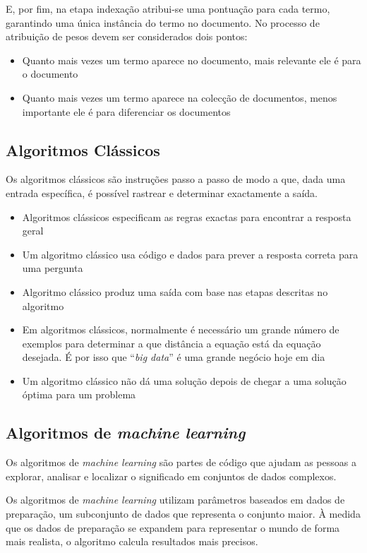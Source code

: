 E, por fim, na etapa indexação atribui-se uma pontuação para cada termo, garantindo uma única instância do termo no documento.
No processo de atribuição de pesos devem ser considerados dois pontos:
\begin{itemize}
  \item Quanto mais vezes um termo aparece no documento, mais relevante ele é para o documento
  \item Quanto mais vezes um termo aparece na colecção de documentos, menos importante ele é para diferenciar os documentos
\end{itemize}

\subsection{Algoritmos Clássicos}

Os algoritmos clássicos são instruções passo a passo de modo a que, dada uma entrada específica, é possível rastrear e determinar exactamente a saída.
\begin{itemize}
  \item Algoritmos clássicos especificam as regras exactas para encontrar a resposta geral
  \item Um algoritmo clássico usa código e dados para prever a resposta correta para uma pergunta
  \item Algoritmo clássico produz uma saída com base nas etapas descritas no algoritmo
  \item Em algoritmos clássicos, normalmente é necessário um grande número de exemplos para determinar a que distância a equação está da equação desejada. É por isso que ``\textit{big data}'' é uma grande negócio hoje em dia
  \item Um algoritmo clássico não dá uma solução depois de chegar a uma solução óptima para um problema
\end{itemize}

\subsection{Algoritmos de \textit{machine learning}}

Os algoritmos de \textit{machine learning} são partes de código que ajudam as pessoas a explorar, analisar e localizar o significado em conjuntos de dados complexos.

Os algoritmos de \textit{machine learning} utilizam parâmetros baseados em dados de preparação, um subconjunto de dados que representa o conjunto maior.
À medida que os dados de preparação se expandem para representar o mundo de forma mais realista, o algoritmo calcula resultados mais precisos.

